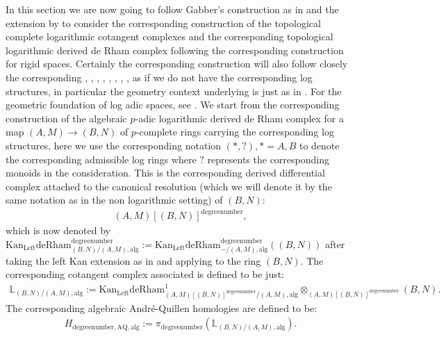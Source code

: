 \documentclass[11pt]{book}
\theoremstyle{definition}
\numberwithin{equation}{section}
\begin{document}
\indent In this section we are now going to follow Gabber's construction as in \cite[Chapter 8]{12O} and the extension by \cite[Chapter 5, Chapter 6, Chapter 7]{12B1} to consider the corresponding construction of the topological complete logarithmic cotangent complexes and the corresponding topological logarithmic derived de Rham complex following the corresponding construction for rigid spaces. Certainly the corresponding construction will also follow closely the corresponding \cite[Chapitre 3]{12An1}, \cite{12An2}, \cite[Chapter 2, Chapter 8]{12B1}, \cite[Chapter 1]{12Bei}, \cite[Chapter 5]{12G1}, \cite[Chapter 3, Chapter 4]{12GL}, \cite[Chapitre II, Chapitre III]{12Ill1}, \cite[Chapitre VIII]{12Ill2}, \cite[Section 4]{12Qui} as if we do not have the corresponding log structures, in particular the geometry context underlying is just as in \cite[Chapter 3, Chapter 4]{12GL}. For the geometric foundation of log adic spaces, see \cite{12DLLZ1}. We start from the corresponding construction of the algebraic $p$-adic logarithmic derived de Rham complex for a map $(A,M)\rightarrow (B,N)$ of $p$-complete rings carrying the corresponding log structures, here we use the corresponding notation $(*,?),*=A,B$ to denote the corresponding admissible log rings where $?$ represents the corresponding monoids in the consideration. This is the corresponding derived differential complex attached to the canonical resolution (which we will denote it by the same notation as in the non logarithmic setting) of $(B,N)$:
\begin{align}
(A,M)[(B,N)]^\text{degreenumber},	
\end{align}
which is now denoted by $\mathrm{Kan}_\mathrm{Left}\mathrm{deRham}^\text{degreenumber}_{(B,N)/(A,M),\mathrm{alg}}:=\mathrm{Kan}_\mathrm{Left}\mathrm{deRham}^\text{degreenumber}_{-/(A,M),\mathrm{alg}}((B,N))$ after taking the left Kan extension as in \cite[Chapter 6]{12B1} and applying to the ring $(B,N)$. The corresponding cotangent complex associated is defined to be just:
\begin{align}
\mathbb{L}_{(B,N)/(A,M),\mathrm{alg}}:=	\mathrm{Kan}_\mathrm{Left}\mathrm{deRham}^1_{(A,M)[(B,N)]^\text{degreenumber}/(A,M),\mathrm{alg}}\otimes_{(A,M)[(B,N)]^\text{degreenumber}} (B,N).
\end{align}
The corresponding algebraic Andr\'e-Quillen homologies are defined to be:
\begin{align}
H_{\text{degreenumber},{\mathrm{AQ}},\mathrm{alg}}:=\pi_\text{degreenumber} (\mathbb{L}_{(B,N)/(A,M),\mathrm{alg}}). 	
\end{align}
\end{document}
